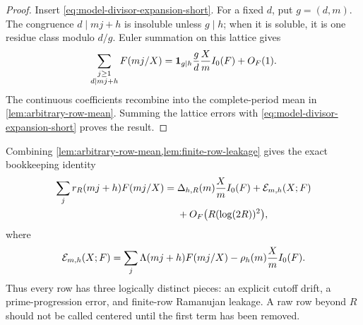 \begin{proof}
Insert \eqref{eq:model-divisor-expansion-short}.  For a fixed $d$, put
$g=(d,m)$.  The congruence $d\mid mj+h$ is insoluble unless $g\mid h$;
when it is soluble, it is one residue class modulo $d/g$.  Euler summation
on this lattice gives
\[
 \sum_{\substack{j\ge1\\d\mid mj+h}}F(mj/X)
 =\mathbf 1_{g\mid h}\frac gd\frac Xm I_0(F)+O_F(1).
\]
The continuous coefficients recombine into the complete-period mean in
\cref{lem:arbitrary-row-mean}.  Summing the lattice errors with
\eqref{eq:model-divisor-expansion-short} proves the result.
\end{proof}

Combining \cref{lem:arbitrary-row-mean,lem:finite-row-leakage} gives the
exact bookkeeping identity
\begin{align}
 \sum_j r_R(mj+h)F(mj/X)
 ={}&\Delta_{h,R}(m)\frac Xm I_0(F)
 +\mathcal E_{m,h}(X;F)
 \notag\\
 &+O_F\bigl(R(\log(2R))^2\bigr),
 \label{eq:row-drift-error-leakage}
\end{align}
where
\begin{equation}
 \mathcal E_{m,h}(X;F)=
 \sum_j\Lambda(mj+h)F(mj/X)
 -\rho_h(m)\frac Xm I_0(F).
 \label{eq:prime-row-error}
\end{equation}
Thus every row has three logically distinct pieces: an explicit cutoff
drift, a prime-progression error, and finite-row Ramanujan leakage.  A raw
row beyond $R$ should not be called centered until the first term has
been removed.
